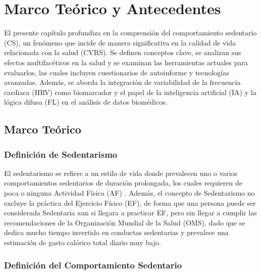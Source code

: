 ﻿\chapter{Marco Teórico y Antecedentes}
\label{chap:marco_teorico}

\noindent El presente capítulo profundiza en la comprensión del comportamiento sedentario (CS), un fenómeno que incide de manera significativa en la calidad de vida relacionada con la salud (CVRS). Se definen conceptos clave, se analizan sus efectos multifacéticos en la salud y se examinan las herramientas actuales para evaluarlos, las cuales incluyen cuestionarios de autoinforme y tecnologías avanzadas. Además, se aborda la integración de variabilidad de la frecuencia cardiaca (HRV) como biomarcador y el papel de la inteligencia artificial (IA) y la lógica difusa (FL) en el análisis de datos biomédicos.

\section{Marco Teórico}
\label{sec:marco_teorico}

\subsection{Definición de Sedentarismo}
\label{subsec:definicion_sedentarismo}

El sedentarismo se refiere a un estilo de vida donde prevalecen uno o varios comportamientos sedentarios de duración prolongada, los cuales requieren de poca o ninguna Actividad Física (AF) \citep{Tremblay2010Physiological}. Además, el concepto de Sedentarismo no excluye la práctica del Ejercicio Físico (EF), de forma que una persona puede ser considerada Sedentaria aun si llegara a practicar EF, pero sin llegar a cumplir las recomendaciones de la Organización Mundial de la Salud (OMS), dado que se dedica mucho tiempo invertido en conductas sedentarias y prevalece una estimación de gasto calórico total diario muy bajo.

\subsection{Definición del Comportamiento Sedentario}
\label{subsec:definicion_cs}

